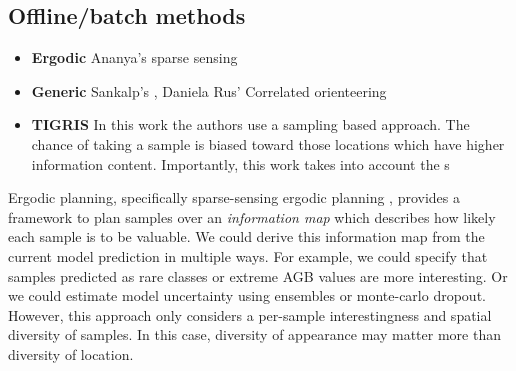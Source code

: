 


\subsection{Offline/batch methods}
\begin{itemize}
    \item \textbf{Ergodic} Ananya's sparse sensing \cite{Rao}
    \item \textbf{Generic} Sankalp's \cite{Arora2017RandomizedConstraints}, Daniela Rus' Correlated orienteering \cite{Yu2016CorrelatedTasks}
    \item \textbf{TIGRIS} \cite{Moon2022TIGRIS:Planning}
    In this work the authors use a sampling based approach. The chance of taking a sample is biased toward those locations which have higher information content. Importantly, this work takes into account the s
\end{itemize}

Ergodic planning, specifically sparse-sensing ergodic planning \cite{Rao}, provides a framework to plan samples over an \textit{information map} which describes how likely each sample is to be valuable. We could derive this information map from the current model prediction in multiple ways. For example, we could specify that samples predicted as rare classes or extreme AGB values are more interesting. Or we could estimate model uncertainty using ensembles or monte-carlo dropout. However, this approach only considers a per-sample interestingness and spatial diversity of samples. In this case, diversity of appearance may matter more than diversity of location. 



